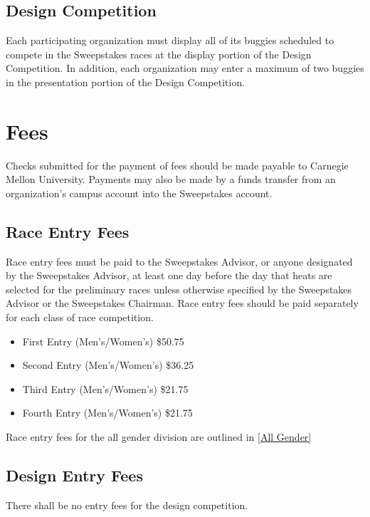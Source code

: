 \subsection{Design Competition}

	Each participating organization must display all of its buggies scheduled to compete in the Sweepstakes races at the display portion of the Design Competition. In addition, each organization may enter a maximum of two buggies in the presentation portion of the Design Competition.

\section{Fees}

	Checks submitted for the payment of fees should be made payable to Carnegie Mellon University. Payments may also be made by a funds transfer from an organization's campus account into the Sweepstakes account. 

\subsection{Race Entry Fees}

	Race entry fees must be paid to the Sweepstakes Advisor, or anyone designated by the Sweepstakes Advisor, at least one day before the day that heats are selected for the preliminary races unless otherwise specified by the Sweepstakes Advisor or the Sweepstakes Chairman. Race entry fees should be paid separately for each class of race competition.

	\begin{itemize}
		\item First Entry (Men's/Women's) \$50.75
		\item Second Entry (Men's/Women's) \$36.25
		\item Third Entry (Men's/Women's) \$21.75
		\item Fourth Entry (Men's/Women's) \$21.75
	\end{itemize}

	Race entry fees for the all gender division are outlined in \ref{All Gender}

\subsection{Design Entry Fees}

	There shall be no entry fees for the design competition.


